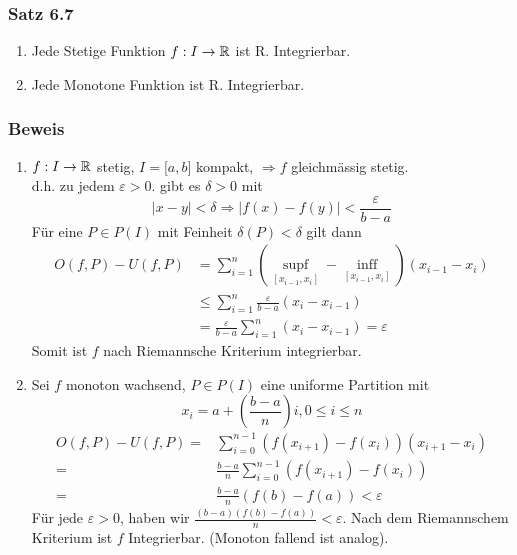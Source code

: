 \subsubsection*{Satz 6.7}
\begin{enumerate}
\item Jede Stetige Funktion $f:I\to \mathbb{R}$ ist R. Integrierbar.
\item Jede Monotone Funktion ist R. Integrierbar.
\end{enumerate}
\subsubsection*{Beweis}
\begin{enumerate}
\item $f:I\to\mathbb{R}$ stetig, $I=\lbrack a,b\rbrack$ kompakt, $\Rightarrow f$ gleichmässig stetig.\\
d.h. zu jedem $\varepsilon >0$. gibt es $\delta >0$ mit \[\left| {x - y} \right| < \delta  \Rightarrow \left| {f(x) - f(y)} \right| < \frac{\varepsilon }{{b - a}}\]
Für eine $P\in P(I)$ mit Feinheit $\delta(P)<\delta$ gilt dann 
\begin{align*}
O(f,P)-U(f,P)&=\sum\limits_{i = 1}^n {(\mathop {\sup f}\limits_{[{x_{i - 1}},{x_i}]}  - \mathop {\inf f}\limits_{[{x_{i - 1}},{x_i}]} )} ({x_{i - 1}} - {x_i}) \\
&\le \sum\limits_{i = 1}^n {\frac{\varepsilon }{{b - a}}}({x_i} - {x_{i - 1}}) \\
&= \frac{\varepsilon }{{b - a}}\sum\limits_{i = 1}^n {({x_i} - {x_{i - 1}})}  = \varepsilon 
\end{align*}
Somit ist $f$ nach Riemannsche Kriterium integrierbar.

\item Sei $f$ monoton wachsend, $P\in P(I)$ eine uniforme Partition mit \[x_i = a+\left(\frac{b-a}{n}\right)i, 0\leq i \leq n\]
\begin{align*}
O(f,P) - U(f,P) =&\sum\limits_{i = 0}^{n - 1} {(f({x_{i + 1}}) - f({x_i}))({x_{i + 1}} - {x_i})} \\
=&\frac{{b - a}}{n}\sum\limits_{i = 0}^{n - 1} {(f({x_{i + 1}}) - f({x_i}))} \\
=&\frac{{b - a}}{n}(f(b) - f(a)) < \varepsilon 
\end{align*}
Für jede $\varepsilon>0$, haben wir $\frac{{(b - a)(f(b) - f(a))}}{n} < \varepsilon$. Nach dem Riemannschem Kriterium ist $f$ Integrierbar. (Monoton fallend ist analog). 
\end{enumerate}

